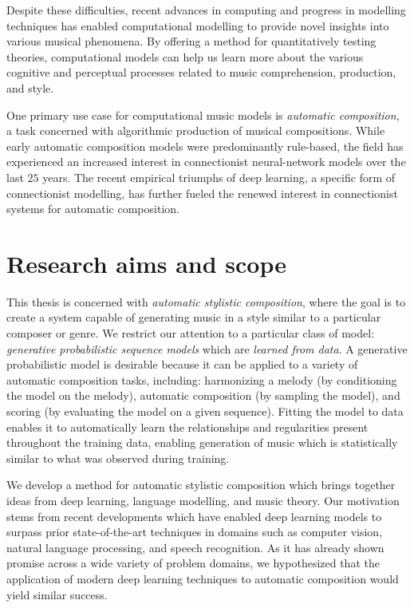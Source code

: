 Despite these difficulties, recent advances in computing and progress in
modelling techniques has enabled computational modelling to provide novel
insights into various musical phenomena. By offering a method for
quantitatively testing theories, computational models can help us learn more
about the various cognitive and perceptual processes related to music
comprehension, production, and style.

One primary use case for computational music models is \emph{automatic
composition}, a task concerned with algorithmic production of musical
compositions. While early automatic composition models were predominantly
rule-based, the field has experienced an increased interest in connectionist
neural-network models over the last $25$ years. The recent empirical triumphs
of deep learning, a specific form of connectionist modelling, has further
fueled the renewed interest in connectionist systems for automatic
composition.

\section{Research aims and scope}

This thesis is concerned with \emph{automatic stylistic composition}, where the
goal is to create a system capable of generating music in a style similar to a
particular composer or genre. We restrict our attention to a particular class
of model: \emph{generative probabilistic sequence models} which are
\emph{learned from data}. A generative probabilistic model is desirable because
it can be applied to a variety of automatic composition tasks, including:
harmonizing a melody (by conditioning the model on the melody), automatic
composition (by sampling the model), and scoring (by evaluating the model on a
given sequence). Fitting the model to data enables it to automatically learn
the relationships and regularities present throughout the training data,
enabling generation of music which is statistically similar to what was
observed during training.

We develop a method for automatic stylistic composition which brings together
ideas from deep learning, language modelling, and music theory. Our motivation
stems from recent developments
\citep{srivastava2014dropout,ioffe2015batch,el1995hierarchical,schmidhuber1992learning}
which have enabled deep learning models to surpass prior state-of-the-art
techniques in domains such as computer vision, natural language processing, and
speech recognition. As it has already shown promise across a wide variety of
problem domains, we hypothesized that the application of modern deep learning
techniques to automatic composition would yield similar success.

